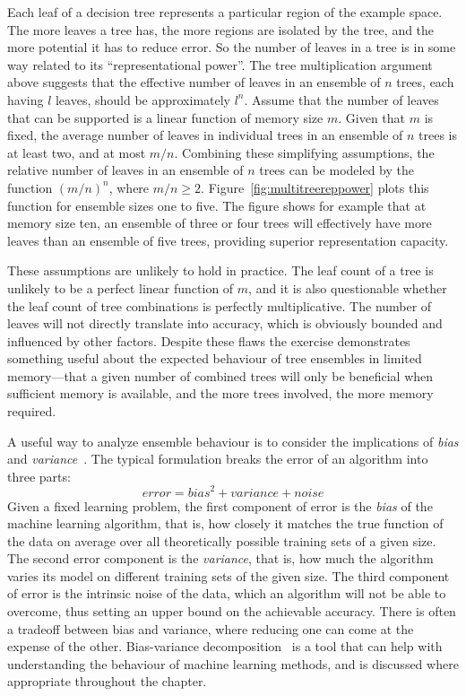Each leaf of a decision tree represents a particular region of the example space. The more leaves a tree has, the more regions are isolated by the tree, and the more potential it has to reduce error. So the number of leaves in a tree is in some way related to its ``representational power''. The tree multiplication argument above suggests that the effective number of leaves in an ensemble of $n$ trees, each having $l$ leaves, should be approximately $l^n$. 
Assume that the number of leaves that can be supported is a linear function of memory size $m$. Given that $m$ is fixed, the average number of leaves in individual trees in an ensemble of $n$ trees is at least two, and at most $m/n$. Combining these simplifying assumptions, the relative number of leaves in an ensemble of $n$ trees can be modeled by the function $(m/n)^n$, where $m/n \ge 2$. Figure~\ref{fig:multitreereppower} plots this function for ensemble sizes one to five. The figure shows for example that at memory size ten, an ensemble of three or four trees will effectively have more leaves than an ensemble of five trees, providing superior representation capacity.

These assumptions are unlikely to hold in practice. The leaf count of a tree is unlikely to be a perfect linear function of $m$, and it is also questionable whether the leaf count of tree combinations is perfectly multiplicative. The number of leaves will not directly translate into accuracy, which is obviously bounded and influenced by other factors. Despite these flaws the exercise demonstrates something useful about the expected behaviour of tree ensembles in limited memory---that a given number of combined trees will only be beneficial when sufficient memory is available, and the more trees involved, the more memory required. %

A useful way to analyze ensemble behaviour is to consider the implications of {\em bias} and {\em variance}~\cite{bvdilemma, bvdecomp}. The typical formulation breaks the error of an algorithm into three parts:
\begin{equation} \label{eq:bvdecomp}
error = bias^2 + variance + noise
\end{equation}
Given a fixed learning problem, the first component of error is the {\em bias} of the machine learning algorithm, that is, how closely it matches the true function of the data on average over all theoretically possible training sets of a given size. The second error component is the {\em variance}, that is, how much the algorithm varies its model on different training sets of the given size. The third component of error is the intrinsic noise of the data, which an algorithm will not be able to overcome, thus setting an upper bound on the achievable accuracy. There is often a tradeoff between bias and variance, where reducing one can come at the expense of the other. Bias-variance decomposition~\cite{bvdecomp} is a tool that can help with understanding the behaviour of machine learning methods, and is discussed where appropriate throughout the chapter. %

